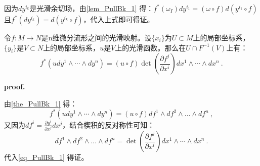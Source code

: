 因为$dy^{i_k}$是光滑余切场，由\autoref{lem_PullBk_1} 得：$f^*(\omega_I)dy^{i_1}=(\omega\circ f)d(y^{i_1}\circ f)$
且$f^*(dy^{i_k})=d(y^{i_k}\circ f)$，代入上式即可得证。

\begin{theorem}{}
令$f:M\rightarrow N$是n维微分流形之间的光滑映射。设$\{x_i\}$为$U\subset M$上的局部坐标系，$\{y_i\}$是$V\subset N$上的局部坐标系，$u$是$V$上的光滑函数。那么在$U\cap F^{-1}(V)$上有：
\begin{equation}
f^*\left(u d y^1 \wedge \cdots \wedge d y^n\right)=(u \circ f) \operatorname{det}\left(\frac{\partial f^j}{\partial x^i}\right) d x^1 \wedge \cdots \wedge d x^n~.
\end{equation}
\end{theorem}
\textbf{proof.}

由\autoref{the_PullBk_1} 得：
\begin{equation}\label{eq_PullBk_1}
f^*\left(u d y^1 \wedge \cdots \wedge d y^n\right)=(u \circ f) df^1\wedge df^2\wedge ...\wedge  df^n~,
\end{equation}
又因为$df^i=\frac{\partial y^i}{\partial x^j}dx^j$，结合楔积的反对称性可知：
\begin{equation}
df^1\wedge df^2\wedge ...\wedge  df^n=\operatorname{det}\left(\frac{\partial f^j}{\partial x^i}\right) d x^1 \wedge \cdots \wedge d x^n~.
\end{equation}
代入\autoref{eq_PullBk_1} 得证。